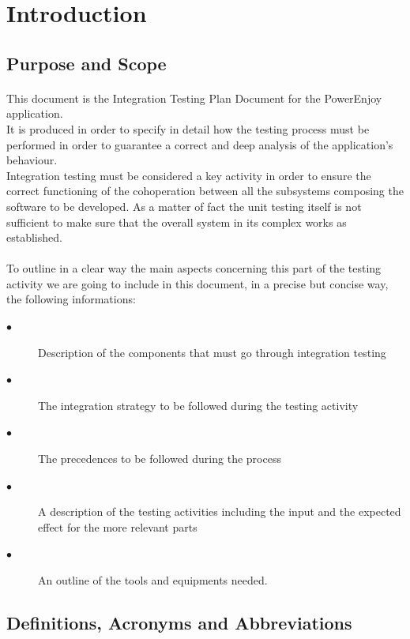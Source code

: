 \documentclass[a4paper,10pt]{article}
\begin{document}
\maketitle
\section{Introduction}
\subsection{Purpose and Scope}
\paragraph{} This document is the Integration Testing Plan Document for the PowerEnjoy application. \\ It is produced in order to specify in detail how
the testing process must be performed in order to guarantee a correct and deep analysis of the application's behaviour.\\ Integration testing must be considered a key 
activity in order to ensure the correct functioning of the cohoperation between all the subsystems composing the software to be developed. As a matter of fact the unit testing itself is not 
sufficient to make sure that the overall system in its complex works as established. \\
\paragraph{}To outline in a clear way the main aspects concerning this part of the testing activity we are going to include in this document, in a precise but concise way, the following informations:
  \begin{description}
    \item[$\bullet$] Description of the components that must go through integration testing
    \item[$\bullet$] The integration strategy to be followed during the testing activity
    \item[$\bullet$] The precedences to be followed during the process
    \item[$\bullet$] A description of the testing activities including the input and the expected effect for the more relevant parts
    \item[$\bullet$] An outline of the tools and equipments needed.
  \end{description}
\subsection{Definitions, Acronyms and Abbreviations}
\end{document}
